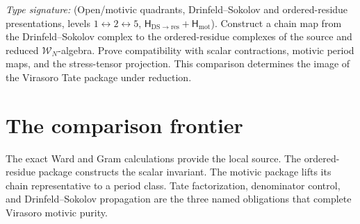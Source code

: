 \begin{problem}
\ClaimStatusOpen
\label{cor:vir-purity-propagates-to-dress-reduced}
\emph{Type signature:}
\textup{(Open/motivic quadrants, Drinfeld--Sokolov and ordered-residue
presentations, levels \(1\leftrightarrow2\leftrightarrow5\),
\(\mathsf H_{\mathrm{DS}\to\mathrm{res}}
+\mathsf H_{\mathrm{mot}}\)).}
Construct a chain map from the Drinfeld--Sokolov complex to the
ordered-residue complexes of the source and reduced
\(\mathcal W_N\)-algebra.  Prove compatibility with scalar
contractions, motivic period maps, and the stress-tensor projection.
This comparison determines the image of the Virasoro Tate package
under reduction.
\end{problem}

\section{The comparison frontier}
\label{sec:vmp-epilogue}

The exact Ward and Gram calculations provide the local source.  The
ordered-residue package constructs the scalar invariant.  The motivic
package lifts its chain representative to a period class.  Tate
factorization, denominator control, and Drinfeld--Sokolov propagation
are the three named obligations that complete Virasoro motivic
purity.
